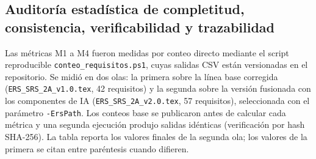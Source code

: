 
\subsection{Auditoría estadística de completitud, consistencia, verificabilidad y trazabilidad}
\label{subsec:m1-m4}

Las métricas M1 a M4 fueron medidas por conteo directo mediante el script
reproducible \texttt{conteo\_requisitos.ps1}, cuyas salidas CSV están
versionadas en el repositorio. Se midió en dos olas: la primera sobre la línea
base corregida (\texttt{ERS\_SRS\_2A\_v1.0.tex}, 42 requisitos) y la segunda
sobre la versión fusionada con los componentes de IA
(\texttt{ERS\_SRS\_2A\_v2.0.tex}, 57 requisitos), seleccionada con el
parámetro \texttt{-ErsPath}. Los conteos base se publicaron antes de calcular
cada métrica y una segunda ejecución produjo salidas idénticas (verificación
por hash SHA-256). La tabla reporta los valores finales de la segunda ola; los
valores de la primera se citan entre paréntesis cuando difieren.

